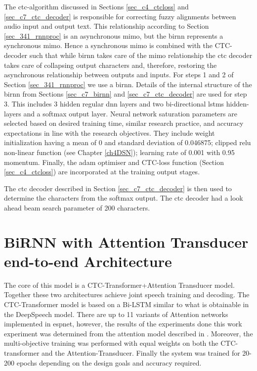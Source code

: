 The \acrshort{ctc}-algorithm discussed in Sections \ref{sec_c4_ctcloss} and \ref{sec_c7_ctc_decoder} is responsible for correcting fuzzy alignments between audio input and output text.  This relationship according to Section \ref{sec_341_rnnproc} is an asynchronous \acrshort{mimo}, but the \acrshort{birnn} represents a synchronous \acrshort{mimo}. Hence a synchronous \acrshort{mimo} is combined with the CTC-decoder such that while \acrshort{birnn} takes care of the \acrlong{mimo} relationship the \acrshort{ctc} decoder takes care of collapsing output characters and, therefore, restoring the asynchronous relationship between outputs and inputs.  For steps 1 and 2 of Section \ref{sec_341_rnnproc} we use a \acrshort{birnn}.  Details of the internal structure of the \acrshort{birnn} from Sections \ref{sec_c7_birnn} and \ref{sec_c7_ctc_decoder} are used for step 3.  This includes 3 hidden regular \acrshort{dnn} layers and two bi-directional \acrshort{lstm}s hidden-layers and a softmax output layer.  Neural network saturation parameters are selected based on desired training time, similar research practice, and accuracy expectations in line with the research objectives. They include weight initialization having a mean of 0 and standard deviation of 0.046875; clipped \acrshort{relu} non-linear function (see Chapter \ref{ch4DSN}); learning rate of 0.001 with 0.95 momentum.  Finally, the adam optimiser and CTC-loss function (Section \ref{sec_c4_ctcloss}) are incorporated at the training output stages.

The \acrshort{ctc} decoder described in Section \ref{sec_c7_ctc_decoder} is then used to determine the characters from the softmax output.  The \acrshort{ctc} decoder had a look ahead beam search parameter of 200 characters.

\section{BiRNN with Attention Transducer end-to-end Architecture}\label{sec_7_5_blstm_t}

The core of this model is a CTC-Transformer+Attention Transducer model.  Together these two architectures achieve joint speech training and decoding.  The CTC-Transformer model is based on a Bi-LSTM similar to what is obtainable in the DeepSpeech model. There are up to 11 variants of Attention networks implemented in \acrshort{espnet}, however, the results of the experiments done this work experiment was determined from the attention model described in \cite{chorowski2015attention}.  Moreover, the multi-objective training was performed with equal weights on both the CTC-transformer and the Attention-Transducer.  Finally the system was trained for 20-200 epochs depending on the design goals and accuracy required.

